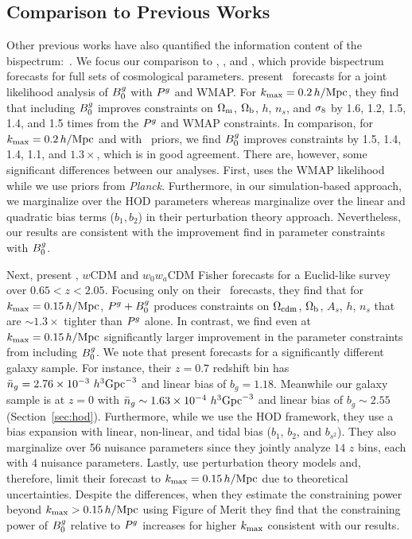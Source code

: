 \subsection{Comparison to Previous Works}
Other previous works have also quantified the information content of the
bispectrum:~\citep[\eg][]{scoccimarro2004, sefusatti2006, sefusatti2007,
song2015, tellarini2016, yamauchi2017a, karagiannis2018, yankelevich2019,
chudaykin2019, coulton2019, reischke2019, agarwal2020}. 
We focus our comparison to \cite{sefusatti2006}, \cite{yankelevich2019},
\cite{agarwal2020} and \cite{chudaykin2019}, which provide bispectrum forecasts for 
full sets of cosmological parameters.
\cite{sefusatti2006} present \lcdm~forecasts for a joint likelihood analysis of
$B^g_0$ with $P^g$ and WMAP. For $k_{\rm max} = 0.2\,h/\mathrm{Mpc}$, they find that including
$B^g_0$ improves constraints on $\Omega_{\rm m}$, $\Omega_{\rm b}$, $h$, $n_s$, and $\sigma_8$ by 1.6, 1.2,
1.5, 1.4, and 1.5 times from the $P^g$ and WMAP constraints. In comparison, for 
$k_{\rm max} = 0.2\,h/\mathrm{Mpc}$ and with \planck~priors, we find $B^g_0$ improves constraints
by  1.5, 1.4, 1.4, 1.1, and $1.3\times$, which is in good agreement. There are,
however, some significant differences between our analyses. First, \cite{sefusatti2006} 
uses the WMAP likelihood while we use priors from {\em Planck}. Furthermore, 
in our simulation-based approach, we marginalize over the HOD parameters
whereas \cite{sefusatti2006} marginalize over the linear and quadratic bias
terms ($b_1, b_2$) in their perturbation theory approach. Nevertheless, our
results are consistent with the improvement \cite{sefusatti2006} find in
parameter constraints with $B^g_0$. 

Next, \cite{yankelevich2019} present \lcdm, $w$CDM and $w_0w_a$CDM Fisher
forecasts for a Euclid-like survey~\citep{laureijs2011} over $0.65 < z < 2.05$.
Focusing only on their \lcdm~forecasts, they find that for $k_{\rm max} = 0.15\,h/\mathrm{Mpc}$, 
$P^g+B^g_0$ produces constraints on $\Omega_{\rm cdm}$, $\Omega_{\rm b}$, $A_s$, $h$, $n_s$ 
that are ${\sim}1.3\times$ tighter than $P^g$ alone. In contrast, we find even
at $k_{\rm max}=0.15\,h/\mathrm{Mpc}$ significantly larger improvement in the parameter constraints 
from including $B^g_0$. We note that \cite{yankelevich2019} present forecasts for
a significantly different galaxy sample. For instance, their $z = 0.7$ redshift
bin has $\bar{n}_g = 2.76 \times 10^{-3}~h^3{\rm Gpc}^{-3}$ and linear bias of
$b_g = 1.18$. Meanwhile our galaxy sample is at $z=0$ with $\bar{n}_g \sim 1.63\times
10^{-4}~h^3{\rm Gpc}^{-3}$ and linear bias of $b_g \sim 2.55$
(Section~\ref{sec:hod}). Furthermore, while we use the HOD framework, they use
a bias expansion with linear, non-linear, and tidal bias ($b_1$, $b_2$, and
$b_{s^2}$). They also marginalize over 56 nuisance parameters since they
jointly analyze $14$ $z$ bins, each with $4$ nuisance parameters.  Lastly,
\cite{yankelevich2019} use perturbation theory models and, therefore, limit
their forecast to $k_{\rm max} = 0.15\,h/\mathrm{Mpc}$ due
to theoretical uncertainties. Despite the differences, when they estimate the constraining
power beyond $k_{\rm max} > 0.15\,h/\mathrm{Mpc}$ using Figure of Merit they find that the
constraining power of $B^g_0$ relative to $P^g$ increases for higher $k_{\rm max}$
consistent with our results. 

